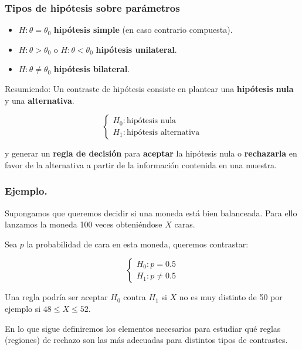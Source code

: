 \begin{frame}
\frametitle{Tipos de hipótesis sobre parámetros}
\begin{itemize}
\item $H: \theta=\theta_{0}$ \textbf{hipótesis simple} (en caso contrario compuesta).
\item $H: \theta>\theta_{0}$ o  $H: \theta<\theta_{0}$ \textbf{hipótesis unilateral}.
\item $H: \theta\not=\theta_{0}$ \textbf{hipótesis bilateral}.
\end{itemize}

    Resumiendo: Un contraste de hipótesis consiste en plantear una
    \textbf{hipótesis nula} y una \textbf{alternativa}.

    $$\left\{\begin{array}{ll}
H_{0}:\mbox{hipótesis nula}\\ H_{1}:\mbox{hipótesis alternativa}
\end{array}\right.$$

y generar un \textbf{regla de decisión} para \textbf{aceptar} la hipótesis nula o \textbf{rechazarla} en favor de la
alternativa a partir de la información contenida en una muestra.
\end{frame}

\begin{frame}

\frametitle{Ejemplo.}
Supongamos que queremos decidir si una moneda está bien balanceada. Para ello lanzamos la
moneda 100 veces obteniéndose $X$ caras.

Sea $p$ la probabilidad de cara en esta moneda, queremos contrastar:


$$\left\{\begin{array}{ll} H_{0}:p=0.5\\ H_{1}:p\not=0.5
\end{array}\right.$$

Una regla podría ser aceptar $H_{0}$ contra $H_{1}$ si $X$ no es muy distinto de 50 por
ejemplo si $48\leq X\leq 52$.

En lo que sigue definiremos los elementos necesarios para estudiar qué reglas (regiones)
de rechazo son las más adecuadas para distintos tipos de contrastes.
\end{frame}

